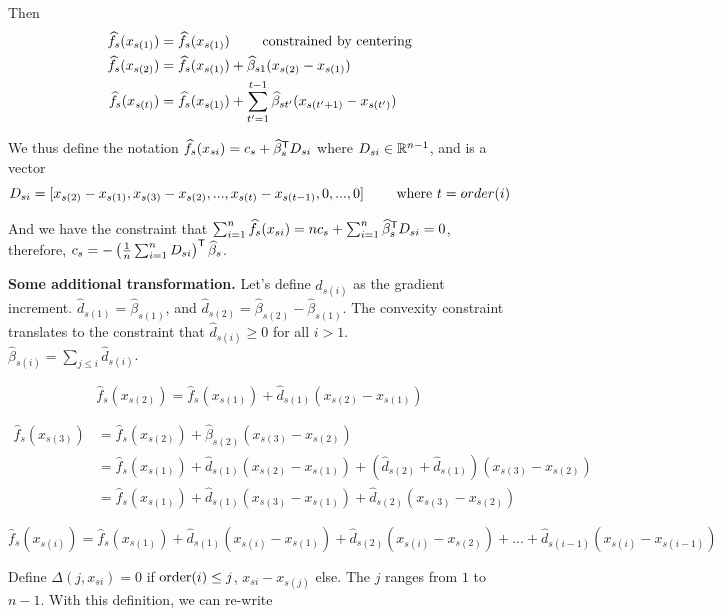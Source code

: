 \documentclass{article}
\begin{document}
Then  
\begin{align*}
\widehat{f}_s(x_{s(1)}) &= \widehat{f}_s(x_{s(1)})  \qquad \textrm{ constrained by centering}\\
\widehat{f}_s(x_{s(2)}) &= \widehat{f}_s(x_{s(1)}) + \widehat{\beta}_{s1} (x_{s(2)}-x_{s(1)} )\\
\widehat{f}_s(x_{s(t)}) &= \widehat{f}_s(x_{s(1)}) + \sum_{t' = 1}^{t-1} \widehat{\beta}_{s t'} ( x_{s (t'+1)} - x_{s (t')}) 
\end{align*}

We thus define the notation $\widehat{f}_s(x_{si}) = c_s + \widehat{\beta}_s^{\mathsf{T}} D_{si}$ where $D_{si} \in \mathbb{R}^{n-1}$, and is a vector
\[
D_{si} = [ x_{s(2)} - x_{s(1)}, x_{s(3)} - x_{s(2)}, ..., x_{s(t)} - x_{s(t-1)}, 0, ..., 0] \qquad \textrm{ where } t = order(i)
\]

And we have the constraint that $\sum_{i=1}^n \widehat{f}_s(x_{si}) = n c_s + \sum_{i=1}^n \widehat{\beta}_s^{\mathsf{T}} D_{si} = 0$, therefore, $c_s = - \left( \frac{1}{n} \sum_{i=1}^n  D_{si} \right)^{\mathsf{T}} \widehat{\beta}_s$. 

\textbf{Some additional transformation.} Let's define $\hat{d}_{s(i)}$ as the gradient increment. $\hat{d}_{s(1)} = \hat{\beta}_{s(1)}$, and $\hat{d}_{s(2)} = \hat{\beta}_{s(2)} - \hat{\beta}_{s(1)}$. The convexity constraint translates to the constraint that $\hat{d}_{s(i)} \geq 0$ for all $i > 1$.\\

$\hat{\beta}_{s(i)} = \sum_{j \leq i} \hat{d}_{s(i)}$. 

\[
\hat{f}_s(x_{s(2)}) = \hat{f}_s(x_{s(1)}) + \hat{d}_{s(1)} ( x_{s(2)} - x_{s(1)})
\]

\begin{align*}
\hat{f}_s(x_{s(3)}) &= \hat{f}_s(x_{s(2)}) + \hat{\beta}_{s(2)} ( x_{s(3)} - x_{s(2)}) \\
 &= \hat{f}_s({x_{s(1)}}) + \hat{d}_{s(1)} ( x_{s(2)} - x_{s(1)}) + (\hat{d}_{s(2)}+\hat{d}_{s(1)}) (x_{s(3)} - x_{s(2)}) \\
 &= \hat{f}_s({x_{s(1)}}) + \hat{d}_{s(1)} (x_{s(3)}-x_{s(1)} ) + \hat{d}_{s(2)} (x_{s(3)}-x_{s(2)} )
\end{align*}

\[
\hat{f}_s(x_{s(i)}) = \hat{f}_s({x_{s(1)}}) +\hat{d}_{s(1)} ( x_{s(i)} - x_{s(1)}) + \hat{d}_{s(2)} ( x_{s(i)} - x_{s(2)}) + ... + \hat{d}_{s(i-1)} ( x_{s(i)} - x_{s(i-1)})
\]

Define $\Delta(j, x_{si}) = 0$ if $\textrm{order}(i) \leq j$, $x_{si} - x_{s(j)}$ else. The $j$ ranges from $1$ to $n-1$. With this definition, we can re-write
\end{document}
